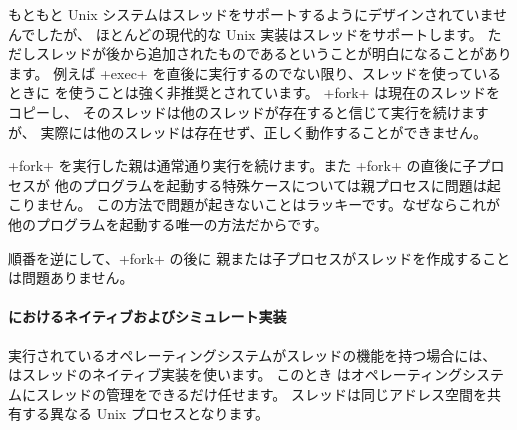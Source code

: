 もともと Unix システムはスレッドをサポートするようにデザインされていませんでしたが、
ほとんどの現代的な Unix 実装はスレッドをサポートします。
ただしスレッドが後から追加されたものであるということが明白になることがあります。
例えば \ml+exec+ を直後に実行するのでない限り、スレッドを使っているときに
 を使うことは強く非推奨とされています。
\ml+fork+ は現在のスレッドをコピーし、
そのスレッドは他のスレッドが存在すると信じて実行を続けますが、
実際には他のスレッドは存在せず、正しく動作することができません。

\ml+fork+ を実行した親は通常通り実行を続けます。また \ml+fork+ の直後に子プロセスが
他のプログラムを起動する特殊ケースについては親プロセスに問題は起こりません。
この方法で問題が起きないことはラッキーです。なぜならこれが
他のプログラムを起動する唯一の方法だからです。

順番を逆にして、\ml+fork+ の後に
親または子プロセスがスレッドを作成することは問題ありません。

\paragraph {\label{sec/thread-implementation} {\ocaml} におけるネイティブおよびシミュレート実装}

実行されているオペレーティングシステムがスレッドの機能を持つ場合には、
\ocaml はスレッドのネイティブ実装を使います。
このとき \ocaml はオペレーティングシステムにスレッドの管理をできるだけ任せます。
スレッドは同じアドレス空間を共有する異なる Unix プロセスとなります。

